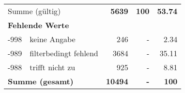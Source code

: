 \begin{longtable}{lXrrr}
     \midrule
     \multicolumn{2}{l}{Summe (gültig)} &
       \textbf{\num{5639}} &
     \textbf{\num{100}} &
       \textbf{\num[round-mode=places,round-precision=2]{53.74}} \\
     \multicolumn{5}{l}{\textbf{Fehlende Werte}}\\
       -998 &
       keine Angabe &
         \num{246} &
        - &
         \num[round-mode=places,round-precision=2]{2.34} \\
       -989 &
       filterbedingt fehlend &
         \num{3684} &
        - &
         \num[round-mode=places,round-precision=2]{35.11} \\
       -988 &
       trifft nicht zu &
         \num{925} &
        - &
         \num[round-mode=places,round-precision=2]{8.81} \\
     \midrule
     \multicolumn{2}{l}{\textbf{Summe (gesamt)}} &
          \textbf{\num{10494}} &
        \textbf{-} &
        \textbf{\num{100}} \\
     \bottomrule
     \end{longtable}
     
